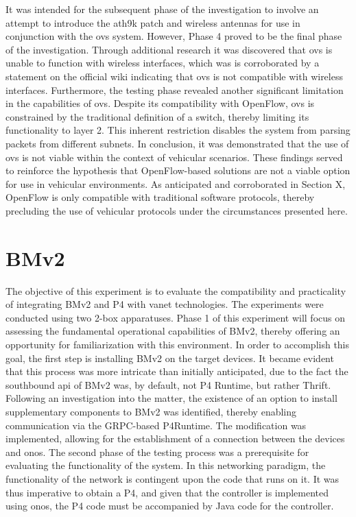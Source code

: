 It was intended for the subsequent phase of the investigation to involve an attempt to introduce the ath9k patch and wireless antennas for use in conjunction with the \gls{ovs} system. However, Phase 4 proved to be the final phase of the investigation. Through additional research it was discovered that \gls{ovs} is unable to function with wireless interfaces, which was is corroborated by a statement on the official wiki\cite{https://docs.openvswitch.org/en/latest/faq/issues/} indicating that \gls{ovs} is not compatible with wireless interfaces.
Furthermore, the testing phase revealed another significant limitation in the capabilities of \gls{ovs}. Despite its compatibility with OpenFlow, \gls{ovs} is constrained by the traditional definition of a switch, thereby limiting its functionality to layer 2. This inherent restriction disables the system from parsing packets from different subnets.
In conclusion, it was demonstrated that the use of \gls{ovs} is not viable within the context of vehicular scenarios. These findings served to reinforce the hypothesis that OpenFlow-based solutions are not a viable option for use in vehicular environments. As anticipated and corroborated in Section X, OpenFlow is only compatible with traditional software protocols, thereby precluding the use of vehicular protocols under the circumstances presented here. 


\section{BMv2}
The objective of this experiment is to evaluate the compatibility and practicality of integrating BMv2 and P4 with \gls{vanet} technologies. The experiments were conducted using two 2-box apparatuses.
Phase 1 of this experiment will focus on assessing the fundamental operational capabilities of BMv2, thereby offering an opportunity for familiarization with this environment. In order to accomplish this goal, the first step is installing BMv2 on the target devices. It became evident that this process was more intricate than initially anticipated, due to the fact the southbound \gls{api} of BMv2 was, by default, not P4 Runtime, but rather Thrift. Following an investigation into the matter, the existence of an option to install supplementary components to BMv2 was identified, thereby enabling communication via the GRPC-based P4Runtime. The modification was implemented, allowing for the establishment of a connection between the devices and \gls{onos}.
The second phase of the testing process was a prerequisite for evaluating the functionality of the system. In this networking paradigm, the functionality of the network is contingent upon the code that runs on it. It was thus imperative to obtain a P4, and given that the controller is implemented using \gls{onos}, the P4 code must be accompanied by Java code for the controller. 

